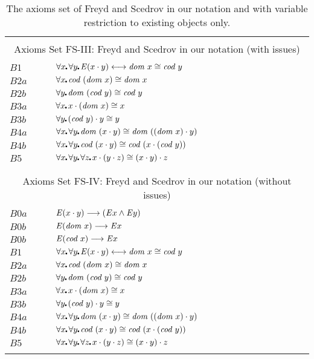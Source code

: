 \begin{table} \centering \normalsize
\begin{tabular}{ll}
\hline
\\
\multicolumn{2}{c}{Axioms Set FS-III: Freyd and Scedrov in our notation (with issues)} \\
\\
  $B1$  & $\all{x}\all{y} \ex (x \comp y) \longleftrightarrow \dom x \cong \cod y$ \\
  $B2a$ & $\all{x} \cod(\dom x) \cong \dom x$ \\  
  $B2b$ & $\all{y} \dom(\cod y) \cong \cod y$ \\  
  $B3a$  & $\all{x} x \comp (\dom x) \cong x$ \\ 
  $B3b$ & $\all{y} (\cod y) \comp y \cong y$ \\
  $B4a$ & $\all{x}\all{y} \dom(x \comp y) \cong \dom((\dom x) \comp y)$ \\ 
  $B4b$ & $\all{x}\all{y} \cod(x \comp y) \cong \cod(x \comp (\cod y))$ \\ 
  $B5$   & $\all{x}\all{y}\all{z} x \comp (y \comp z) \cong  (x \comp y) \comp z$   \\
\\
\hline
\\
\multicolumn{2}{c}{Axioms Set FS-IV: Freyd and Scedrov in our
  notation (without issues)} \\
\\
 $B0a$ & $\mathit{E} (x \cdot y) \longrightarrow  (\mathit{E} x \wedge \mathit{E} y)$ \\
 $B0b$ & $\mathit{E} (\textit{dom \/} x)  \longrightarrow   \mathit{E} x$ \\
 $B0b$ & $\mathit{E} (\textit{cod \/} x)  \longrightarrow   \mathit{E} x$ \\
  $B1$  & $\all{x}\all{y} \ex (x \comp y) \longleftrightarrow \dom x \cong \cod y$ \\
  $B2a$ & $\all{x} \cod(\dom x) \cong \dom x$ \\  
  $B2b$ & $\all{y} \dom(\cod y) \cong \cod y$ \\  
  $B3a$  & $\all{x} x \comp (\dom x) \cong x$ \\ 
  $B3b$ & $\all{y} (\cod y) \comp y \cong y$ \\
  $B4a$ & $\all{x}\all{y} \dom(x \comp y) \cong \dom((\dom x) \comp y)$ \\ 
  $B4b$ & $\all{x}\all{y} \cod(x \comp y) \cong \cod(x \comp (\cod y))$ \\ 
  $B5$   & $\all{x}\all{y}\all{z} x \comp (y \comp z) \cong  (x \comp y) \comp z$   \\
\\
\hline
\end{tabular}
\caption{The axioms set of Freyd and Scedrov in our
  notation and with variable restriction to existing objects only.\label{axioms-sets-3}}
\end{table}



